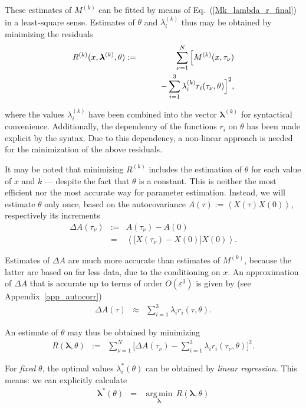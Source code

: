 \documentclass[aps,twocolumn,superscriptaddress,showpacs,showkeys]{revtex4}
\newcommand{\eps}{\varepsilon}
\newcommand{\veclambda}{{\boldsymbol{\lambda}}}
\begin{document}
\noindent These estimates of $M^{(k)}$ can be fitted by means of Eq.~(\ref{Mk_lambda_r_final}) in a least-square sense.
Estimates of $\theta$ and $\lambda^{(k)}_i$ thus may be obtained by minimizing the residuals
%
\begin{eqnarray}
R^{(k)}(x,\veclambda^{(k)},\theta) &:=& \sum_{\nu=1}^N\Big[ M^{(k)}(x,\tau_\nu)\cr
                                   &&\qquad -\sum_{i=1}^3\lambda^{(k)}_i r_i(\tau_\nu,\theta)\Big]^2,
\end{eqnarray}

\noindent where the values $\lambda^{(k)}_i$ have been combined into the vector $\veclambda^{(k)}$ for
syntactical convenience. Additionally, the dependency of the functions $r_i$ on $\theta$ has been made explicit
by the syntax. Due to this dependency, a non-linear approach is needed for the minimization of the above residuals.

It may be noted that minimizing $R^{(k)}$ includes the estimation of $\theta$ for each value of $x$ and $k$ ---
despite the fact that $\theta$ is a constant. This is neither the most efficient nor the most accurate way for parameter
estimation.
Instead, we will estimate $\theta$ only once, based on the autocovariance $A(\tau) := \left<X(\tau)X(0)\right>$,
respectively its increments
%
\begin{eqnarray}
\Delta A(\tau_\nu) &:=& A(\tau_\nu)-A(0)\nonumber\\
&=& \left<\big[X(\tau_\nu)-X(0)\big]X(0)\right>.
\end{eqnarray}

\noindent Estimates of $\Delta A$ are much more accurate than estimates of $M^{(k)}$, because the latter are
based on far less data, due to the conditioning on $x$.
An approximation of $\Delta A$ that is accurate up to terms of order $O(\eps^3)$ is given by (see Appendix~\ref{app_autocorr})
%
\begin{eqnarray}
\Delta A(\tau) &\approx& \sum_{i=1}^3  \lambda_i r_i(\tau,\theta).
\end{eqnarray}

\noindent An estimate of $\theta$ may thus be obtained by minimizing
%
\begin{eqnarray}\label{residual_theta}
R(\veclambda,\theta) &:=& \sum_{\nu=1}^N\Big[ \Delta A(\tau_\nu)
                         -\sum_{i=1}^3\lambda_i r_i(\tau_\nu,\theta)\Big]^2.
\end{eqnarray}

\noindent For {\em fixed} $\theta$, the optimal values $\lambda_i^*(\theta)$
can be obtained by {\em linear regression}. This means: we can explicitly calculate
%
\begin{eqnarray}
\veclambda^*(\theta) &=& \operatorname*{arg\,min}_{\veclambda}\,R(\veclambda,\theta)
\end{eqnarray}
\end{document}
